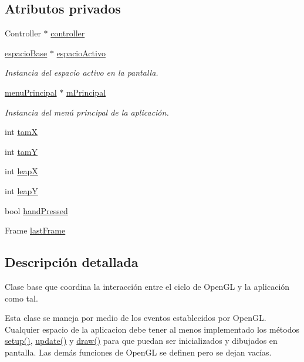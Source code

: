\subsection*{Atributos privados}
\begin{DoxyCompactItemize}
\item 
Controller $\ast$ \hyperlink{classof_app_aaca01b1fe9aa8a406ca09a5c4ede5f99}{controller}
\item 
\hyperlink{classespacio_base}{espacio\+Base} $\ast$ \hyperlink{classof_app_a1e3e4e9da97b2a839dd1255c65f73453}{espacio\+Activo}
\begin{DoxyCompactList}\small\item\em Instancia del espacio activo en la pantalla. \end{DoxyCompactList}\item 
\hyperlink{classmenu_principal}{menu\+Principal} $\ast$ \hyperlink{classof_app_a9ba8bf05bd3a0932461179f47759b83d}{m\+Principal}
\begin{DoxyCompactList}\small\item\em Instancia del menú principal de la aplicación. \end{DoxyCompactList}\item 
int \hyperlink{classof_app_a07b648bd42ef7fda31bf208ccd18d5f8}{tam\+X}
\item 
int \hyperlink{classof_app_ac1e9d00b0014a47490688c3b298a67c9}{tam\+Y}
\item 
int \hyperlink{classof_app_ae5beab7e06a1bedf3a988264d501984c}{leap\+X}
\item 
int \hyperlink{classof_app_a96ce450adbe65fbf40bb099435d7b27d}{leap\+Y}
\item 
bool \hyperlink{classof_app_acd3a56a2f96cc74a240b84649179e79f}{hand\+Pressed}
\item 
Frame \hyperlink{classof_app_a49ee00759b6afa60298b89befa53664f}{last\+Frame}
\end{DoxyCompactItemize}


\subsection{Descripción detallada}
Clase base que coordina la interacción entre el ciclo de Open\+G\+L y la aplicación como tal. 

Esta clase se maneja por medio de los eventos establecidos por Open\+G\+L. Cualquier espacio de la aplicacion debe tener al menos implementado los métodos \hyperlink{classof_app_af68eaa1366244f7a541cd08e02199c12}{setup()}, \hyperlink{classof_app_afef41ea4aee5a22ea530afba33ae7a7b}{update()} y \hyperlink{classof_app_a75dd45437b9e317db73d8daef1ad49f8}{draw()} para que puedan ser inicializados y dibujados en pantalla. Las demás funciones de Open\+G\+L se definen pero se dejan vacías. 

